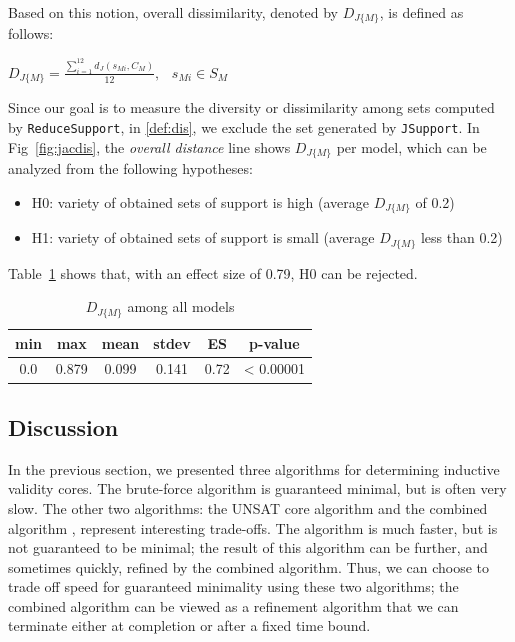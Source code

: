 Based on this notion, overall dissimilarity, denoted by $D_{J\{M\}}$, is defined as follows:

\begin{definition}
  \label{def:dis}
  $D_{J\{M\}} =  \frac{\sum_{i=1}^{12}d_J(s_{Mi}, C_M)}{12},   \hspace{9pt} s_{Mi} \in S_M$
\end{definition}

Since our goal is to measure the diversity or dissimilarity among sets computed by \texttt{ReduceSupport}, in \ref{def:dis}, we exclude the set generated by \texttt{JSupport}. In Fig~\ref{fig:jacdis}, the \emph{overall distance} line shows $D_{J\{M\}}$ per model, which can be analyzed from the following hypotheses:
\begin{itemize}
  \item H0: variety of obtained sets of support is high (average $D_{J\{M\}}$ of 0.2)
  \item H1: variety of obtained sets of support is small (average $D_{J\{M\}}$ less than 0.2)
\end{itemize}
Table~\ref{tab:variety} shows that, with an effect size of 0.79, H0 can be rejected.
\begin{table}
  \centering
  \begin{tabular}{ |c|c|c|c|c|c| }
    \hline
     min & max & mean & stdev & ES & p-value\\[0.5ex]
    \hline
     0.0   & 0.879 & 0.099 & 0.141 & 0.72 & < 0.00001 \\[0.5ex]
    \hline
  \end{tabular}
  \caption{$D_{J\{M\}}$ among all models}
  \label{tab:variety}
\end{table}
\fi


\subsection{Discussion}

In the previous section, we presented three algorithms for determining
inductive validity cores. The brute-force algorithm is guaranteed
minimal, but is often very slow. The other two algorithms: the UNSAT
core algorithm \ucalg and the combined algorithm \ucbfalg, represent
interesting trade-offs. The \ucalg algorithm is much faster, but is
not guaranteed to be minimal; the result of this algorithm can be
further, and sometimes quickly, refined by the combined algorithm.
Thus, we can choose to trade off speed for guaranteed minimality using
these two algorithms; the combined algorithm can be viewed as a
refinement algorithm that we can terminate either at completion or
after a fixed time bound.


